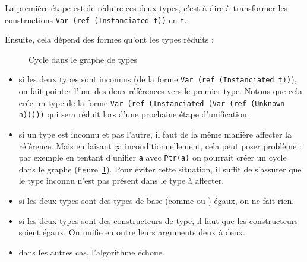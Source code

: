 La première étape est de réduire ces deux types, c'est-à-dire à transformer les
constructions \texttt{Var (ref (Instanciated t))} en \texttt{t}.

Ensuite, cela dépend des formes qu'ont les types réduits :

\begin{figure}
  \centering
  \caption{Cycle dans le graphe de types}
  \label{fig:typecycle}
\end{figure}

\begin{itemize}

\item si les deux types sont inconnus (de la forme \texttt{Var (ref
(Instanciated t))}), on fait pointer l'une des deux références vers le premier
type. Notons que cela crée un type de la forme \texttt{Var (ref (Instanciated
(Var (ref (Unknown n)))))} qui sera réduit lors d'une prochaine étape
d'unification.

\item si un type est inconnu et pas l'autre, il faut de la même manière affecter la
référence. Mais en faisant ça inconditionnellement, cela peut poser problème :
par exemple en tentant d'unifier \texttt{a} avec \texttt{Ptr(a)} on pourrait
créer un cycle dans le graphe (figure~\ref{fig:typecycle}).
Pour éviter cette situation, il suffit de s'assurer que le type inconnu n'est
pas présent dans le type à affecter.

\item si les deux types sont des types de base (comme \tInt ou \tFloat) égaux,
on ne fait rien.

\item si les deux types sont des constructeurs de type, il faut que les
constructeurs soient égaux. On unifie en outre leurs arguments deux à deux.

\item dans les autres cas, l'algorithme échoue.


\end{itemize}

